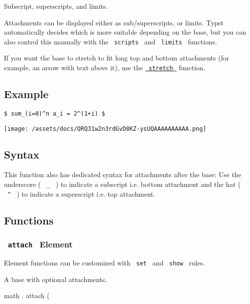 Subscript, superscripts, and limits.

Attachments can be displayed either as sub/superscripts, or limits.
Typst automatically decides which is more suitable depending on the
base, but you can also control this manually with the
\texttt{\ scripts\ } and \texttt{\ limits\ } functions.

If you want the base to stretch to fit long top and bottom attachments
(for example, an arrow with text above it), use the
\href{/docs/reference/math/stretch/}{\texttt{\ stretch\ }} function.

\subsection{Example}\label{example}

\begin{verbatim}
$ sum_(i=0)^n a_i = 2^(1+i) $
\end{verbatim}

\texttt{[image: /assets/docs/QRQ31w2n3rdGvD8KZ-ysUQAAAAAAAAAA.png]}

\subsection{Syntax}\label{syntax}

This function also has dedicated syntax for attachments after the base:
Use the underscore ( \texttt{\ \_\ } ) to indicate a subscript i.e.
bottom attachment and the hat ( \texttt{\ \^{}\ } ) to indicate a
superscript i.e. top attachment.

\subsection{Functions}\label{functions}

\subsubsection{\texorpdfstring{\texttt{\ attach\ } {{ Element
}}}{ attach   Element }}\label{functions-attach}

\label{functions-attach-element-tooltip}
Element functions can be customized with \texttt{\ set\ } and
\texttt{\ show\ } rules.

A base with optional attachments.

math { . } { attach } (

